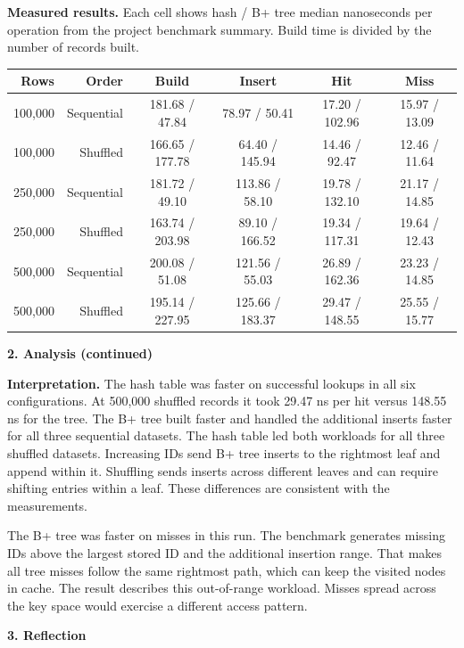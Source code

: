 \documentclass[12pt,letterpaper]{article}
\newcommand{\heading}[1]{\par\addvspace{10pt}\noindent\textbf{#1}\par\nobreak}
\begin{document}
\textbf{Measured results.}
Each cell shows hash / B+ tree median nanoseconds per operation from the
project benchmark summary. Build time is divided by the number of records built.

\begin{center}
\setlength{\tabcolsep}{4pt}
\begin{tabular}{@{}rrcccc@{}}
\toprule
Rows & Order & Build & Insert & Hit & Miss\\
\midrule
100,000 & Sequential & 181.68 / 47.84 & 78.97 / 50.41 & 17.20 / 102.96 & 15.97 / 13.09\\
100,000 & Shuffled   & 166.65 / 177.78 & 64.40 / 145.94 & 14.46 / 92.47 & 12.46 / 11.64\\
250,000 & Sequential & 181.72 / 49.10 & 113.86 / 58.10 & 19.78 / 132.10 & 21.17 / 14.85\\
250,000 & Shuffled   & 163.74 / 203.98 & 89.10 / 166.52 & 19.34 / 117.31 & 19.64 / 12.43\\
500,000 & Sequential & 200.08 / 51.08 & 121.56 / 55.03 & 26.89 / 162.36 & 23.23 / 14.85\\
500,000 & Shuffled   & 195.14 / 227.95 & 125.66 / 183.37 & 29.47 / 148.55 & 25.55 / 15.77\\
\bottomrule
\end{tabular}
\end{center}

\newpage
\heading{2. Analysis (continued)}

\textbf{Interpretation.}
The hash table was faster on successful lookups in all six configurations. At
500,000 shuffled records it took 29.47 ns per hit versus 148.55 ns for the tree.
The B+ tree built faster and handled the additional inserts faster for all three
sequential datasets. The hash table led both workloads for all three shuffled
datasets. Increasing IDs send B+ tree inserts to the rightmost leaf and append
within it. Shuffling sends inserts across different leaves and can require
shifting entries within a leaf. These differences are consistent with the
measurements.

The B+ tree was faster on misses in this run. The benchmark generates missing
IDs above the largest stored ID and the additional insertion range. That makes
all tree misses follow the same rightmost path, which can keep the visited nodes
in cache. The result describes this out-of-range workload. Misses spread across
the key space would exercise a different access pattern.

\heading{3. Reflection}
\end{document}

